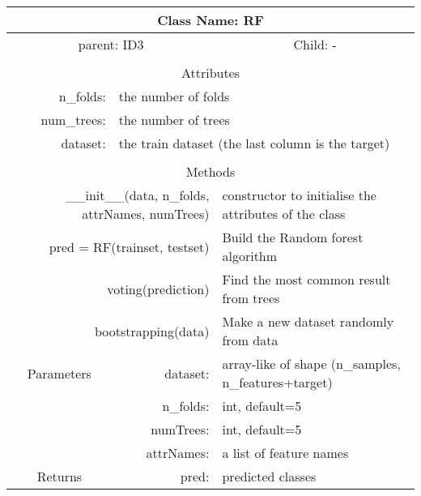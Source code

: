 {\small
\begin{tabular}{llll}
\toprule
\multicolumn{4}{|c|}{Class Name: RF} \\
\midrule
\multicolumn{2}{|c|}{parent: ID3} &\multicolumn{2}{|c|}{Child: -} \\\bottomrule


\multicolumn{4}{c}{} \\\bottomrule
\multicolumn{4}{|c|}{Attributes} \\\midrule
\multicolumn{1}{|r}{n\_folds: } & \multicolumn{3}{l|}{the number of folds } \\
\multicolumn{1}{|r}{num\_trees: } & \multicolumn{3}{l|}{the number of trees } \\
\multicolumn{1}{|r}{dataset: } & \multicolumn{3}{l|}{the train dataset (the last column is the target) } \\\bottomrule


\multicolumn{4}{c}{} \\\bottomrule
\multicolumn{4}{|c|}{Methods} \\\midrule
\multicolumn{2}{|r}{\_\_init\_\_(data, n\_folds, attrNames, numTrees) } & \multicolumn{2}{l|}{constructor to initialise the attributes of the class} \\
\multicolumn{2}{|r}{pred = RF(trainset, testset) } & \multicolumn{2}{l|}{Build the Random forest algorithm} \\
\multicolumn{2}{|r}{voting(prediction) } & \multicolumn{2}{l|}{Find the most common result from trees} \\
\multicolumn{2}{|r}{bootstrapping(data) } & \multicolumn{2}{l|}{Make a new dataset randomly from data} \\ \midrule


\multicolumn{1}{|c|}{Parameters}
& \multicolumn{1}{|r}{dataset:}& \multicolumn{2}{l|}{array-like of shape (n\_samples, n\_features+target)}\\
\multicolumn{1}{|l|}{} & \multicolumn{1}{|r}{n\_folds:}& \multicolumn{2}{l|}{int, default=5}\\
\multicolumn{1}{|l|}{} & \multicolumn{1}{|r}{numTrees:}& \multicolumn{2}{l|}{int, default=5}\\
\multicolumn{1}{|l|}{} & \multicolumn{1}{|r}{attrNames:}& \multicolumn{2}{l|}{a list of feature names}\\\midrule

\multicolumn{1}{|c|}{Returns} & \multicolumn{1}{|r}{pred:}& \multicolumn{2}{l|}{predicted classes}\\




\bottomrule
\end{tabular}}